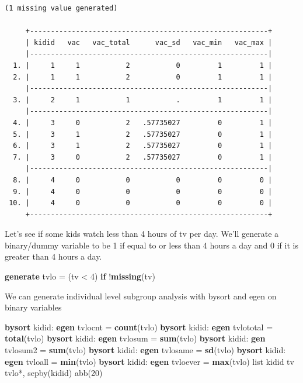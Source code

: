 \documentclass[
]{book}
\newenvironment{Shaded}{\begin{snugshade}}{\end{snugshade}}
\newcommand{\FunctionTok}[1]{\textcolor[rgb]{0.13,0.29,0.53}{\textbf{#1}}}
\newcommand{\KeywordTok}[1]{\textcolor[rgb]{0.13,0.29,0.53}{\textbf{#1}}}
\newcommand{\NormalTok}[1]{#1}
\newcommand{\OtherTok}[1]{\textcolor[rgb]{0.56,0.35,0.01}{#1}}
\begin{document}
\begin{verbatim}
(1 missing value generated)

     +---------------------------------------------------------+
     | kidid   vac   vac_total      vac_sd   vac_min   vac_max |
     |---------------------------------------------------------|
  1. |     1     1           2           0         1         1 |
  2. |     1     1           2           0         1         1 |
     |---------------------------------------------------------|
  3. |     2     1           1           .         1         1 |
     |---------------------------------------------------------|
  4. |     3     0           2   .57735027         0         1 |
  5. |     3     1           2   .57735027         0         1 |
  6. |     3     1           2   .57735027         0         1 |
  7. |     3     0           2   .57735027         0         1 |
     |---------------------------------------------------------|
  8. |     4     0           0           0         0         0 |
  9. |     4     0           0           0         0         0 |
 10. |     4     0           0           0         0         0 |
     +---------------------------------------------------------+
\end{verbatim}

Let's see if some kids watch less than 4 hours of tv per day.
We'll generate a binary/dummy variable to be 1 if equal to or less than 4 hours
a day and 0 if it is greater than 4 hours a day.

\begin{Shaded}
\begin{Highlighting}[]
\KeywordTok{generate}\NormalTok{ tvlo = (tv \textless{} 4) }\KeywordTok{if}\NormalTok{ !}\FunctionTok{missing}\NormalTok{(tv)}
\end{Highlighting}
\end{Shaded}

We can generate individual level subgroup analysis with bysort and egen on
binary variables

\begin{Shaded}
\begin{Highlighting}[]
\KeywordTok{bysort}\NormalTok{ kidid: }\KeywordTok{egen}\NormalTok{ tvlocnt = }\FunctionTok{count}\NormalTok{(tvlo)}
\KeywordTok{bysort}\NormalTok{ kidid: }\KeywordTok{egen}\NormalTok{ tvlototal = }\KeywordTok{total}\NormalTok{(tvlo)}
\KeywordTok{bysort}\NormalTok{ kidid: }\KeywordTok{egen}\NormalTok{ tvlosum = }\KeywordTok{sum}\NormalTok{(tvlo)}
\KeywordTok{bysort}\NormalTok{ kidid: }\KeywordTok{gen}\NormalTok{ tvlosum2 = }\KeywordTok{sum}\NormalTok{(tvlo)}
\KeywordTok{bysort}\NormalTok{ kidid: }\KeywordTok{egen}\NormalTok{ tvlosame = }\FunctionTok{sd}\NormalTok{(tvlo)}
\KeywordTok{bysort}\NormalTok{ kidid: }\KeywordTok{egen}\NormalTok{ tvloall = }\FunctionTok{min}\NormalTok{(tvlo)}
\KeywordTok{bysort}\NormalTok{ kidid: }\KeywordTok{egen}\NormalTok{ tvloever = }\FunctionTok{max}\NormalTok{(tvlo)}
\OtherTok{list}\NormalTok{ kidid tv tvlo*, sepby(kidid) abb(20)}
\end{Highlighting}
\end{Shaded}
\end{document}
